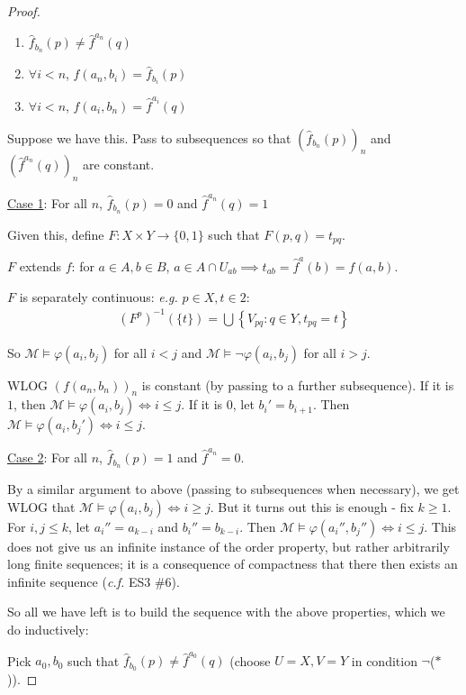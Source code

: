 \documentclass[]{article}
\theoremstyle{custhm}
\theoremstyle{cusdef}
\theoremstyle{custhm}
\theoremstyle{custhm}
\theoremstyle{custhm}
\theoremstyle{ex}
\theoremstyle{custhm}
\theoremstyle{cusdef}
\theoremstyle{remark}
\theoremstyle{remark}
\theoremstyle{numremark}
\newcommand{\ra}{\rightarrow}
\renewcommand{\it}[1]{\textit{#1}}
\newcommand{\M}{\mathcal{M}}
\renewcommand{\phi}{\varphi}
\begin{document}
\begin{proof}
	\begin{enumerate}
		\item $\hat{f}_{b_n}(p) \ne \hat{f}^{a_n}(q)$
		\item $\forall i<n$, $f(a_n,b_i) = \hat{f}_{b_i}(p)$
		\item $\forall i < n$, $f(a_i,b_n) = \hat{f}^{a_i}(q)$
	\end{enumerate}

	Suppose we have this. Pass to subsequences so that $(\hat{f}_{b_n}(p))_n$ and $(\hat{f}^{a_n}(q))_n$ are constant.

	\underline{Case 1}: For all $n$, $\hat{f}_{b_n}(p) = 0$ and $\hat{f}^{a_n}(q) = 1$


	Given this, define $F:X\times Y\ra \{0,1\}$ such that $F(p,q) = t_{pq}$.
	
	$F$ extends $f$: for $a\in A,b\in B$, $a\in A\cap U_{ab}\implies t_{ab} = \hat{f}^a(b) = f(a,b)$.
	
	$F$ is separately continuous: \it{e.g.} $p \in X, t\in 2$:
	\begin{align*}
		(F^p)^{-1}(\{t\}) = \bigcup\left\lbrace V_{pq}:q\in Y,t_{pq} = t\right\rbrace
	\end{align*}

	So $\M\models \phi(a_i,b_j)$ for all $i < j$ and $\M\models \neg\phi(a_i,b_j)$ for all $i > j$.

	WLOG $(f(a_n,b_n))_n$ is constant (by passing to a further subsequence). If it is $1$, then $\M\models \phi(a_i,b_j)\iff i\le j$. If it is $0$, let $b_i' = b_{i+1}$. Then $\M\models \phi(a_i,b_j')\iff i\le j$.

	\underline{Case 2}: For all $n$, $\hat{f}_{b_n}(p) = 1$ and $\hat{f}^{a_n} = 0$.

	By a similar argument to above (passing to subsequences when necessary), we get WLOG that $\M\models \phi(a_i,b_j)\iff i \ge j$. But it turns out this is enough - fix $k\ge 1$. For $i,j\le k$, let $a_i'' = a_{k-i}$ and $b_i'' = b_{k-i}$. Then $\M\models \phi(a_i'',b_j'')\iff i\le j$. This does not give us an infinite instance of the order property, but rather arbitrarily long finite sequences; it is a consequence of compactness that there then exists an infinite sequence (\it{c.f.} ES3 \#6).

	So all we have left is to build the sequence with the above properties, which we do inductively:

	Pick $a_0,b_0$ such that $\hat{f}_{b_0}(p)\ne\hat{f}^{a_0}(q)$ (choose $U = X,V = Y$ in condition $\neg$($\ast$)).


\end{proof}
\end{document}
